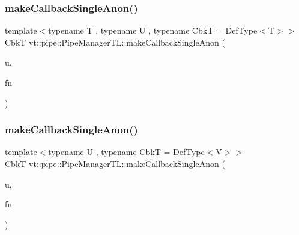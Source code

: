 \subsubsection{\texorpdfstring{make\+Callback\+Single\+Anon()}{makeCallbackSingleAnon()}\hspace{0.1cm}{\footnotesize\ttfamily [2/6]}}
{\footnotesize\ttfamily template$<$typename T , typename U , typename CbkT  = Def\+Type$<$\+T$>$$>$ \\
CbkT vt\+::pipe\+::\+Pipe\+Manager\+T\+L\+::make\+Callback\+Single\+Anon (\begin{DoxyParamCaption}\item[{U $\ast$}]{u,  }\item[{\hyperlink{structvt_1_1pipe_1_1_pipe_manager_base_a73fdf82ece0411b3dc644c99b763f7a9}{Func\+Msg\+Ctx\+Type}$<$ T, U $>$}]{fn }\end{DoxyParamCaption})}

\mbox{\label{structvt_1_1pipe_1_1_pipe_manager_t_l_aaf15f3c5311092b8237901353ac4be9b}} 
\subsubsection{\texorpdfstring{make\+Callback\+Single\+Anon()}{makeCallbackSingleAnon()}\hspace{0.1cm}{\footnotesize\ttfamily [3/6]}}
{\footnotesize\ttfamily template$<$typename U , typename CbkT  = Def\+Type$<$\+V$>$$>$ \\
CbkT vt\+::pipe\+::\+Pipe\+Manager\+T\+L\+::make\+Callback\+Single\+Anon (\begin{DoxyParamCaption}\item[{U $\ast$}]{u,  }\item[{\hyperlink{structvt_1_1pipe_1_1_pipe_manager_base_ad8463823b6b4cfdb67c119d6d22e3bac}{Func\+Ctx\+Type}$<$ U $>$}]{fn }\end{DoxyParamCaption})}

\mbox{\label{structvt_1_1pipe_1_1_pipe_manager_t_l_ae75afb01250ca2dcb98edc05b4aca57d}} 
